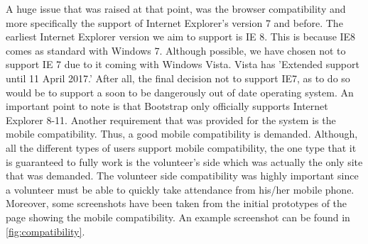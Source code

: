 \documentclass{l3proj}
\begin{document}
A huge issue that was raised at that point, was the browser compatibility and more specifically the support of Internet Explorer’s version 7 and before. The earliest Internet Explorer version we aim to support is IE 8. This is because IE8 comes as standard with Windows 7. Although possible, we have chosen not to support IE 7 due to it coming with Windows Vista. Vista has 'Extended support until 11 April 2017.' After all, the final decision not to support IE7, as to do so would be to support a soon to be dangerously out of date operating system. An important point to note is that Bootstrap only officially supports Internet Explorer 8-11.
Another requirement that was provided for the system is the mobile compatibility. Thus, a good mobile compatibility is demanded. Although, all the different types of users support mobile compatibility, the one type that it is guaranteed to fully work is the volunteer's side which was actually the only site that was demanded. The volunteer side compatibility was highly important since a volunteer must be able to quickly take attendance from his/her mobile phone. Moreover, some screenshots have been taken from the initial prototypes of the page showing the mobile compatibility. An example screenshot can be found in \autoref{fig:compatibility}.
\end{document}
